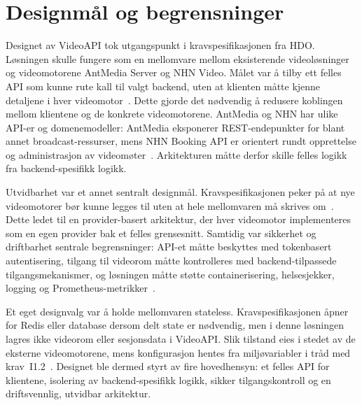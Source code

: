 \section{Designmål og begrensninger}
\label{sec:designmal}

Designet av VideoAPI tok utgangspunkt i kravspesifikasjonen fra HDO. Løsningen
skulle fungere som en mellomvare mellom eksisterende videoløsninger og
videomotorene AntMedia Server og NHN Video. Målet var å tilby ett felles API som
kunne rute kall til valgt backend, uten at klienten måtte kjenne detaljene i hver
videomotor~\cite{hdo_kravspec}. Dette gjorde det nødvendig å redusere koblingen
mellom klientene og de konkrete videomotorene. AntMedia og NHN har ulike API-er
og domenemodeller: AntMedia eksponerer REST-endepunkter for blant annet
broadcast-ressurser, mens NHN Booking API er orientert rundt opprettelse og
administrasjon av videomøter~\cite{antmedia_rest,nhn_booking}. Arkitekturen måtte
derfor skille felles logikk fra backend-spesifikk logikk.

Utvidbarhet var et annet sentralt designmål. Kravspesifikasjonen peker på at nye
videomotorer bør kunne legges til uten at hele mellomvaren må skrives
om~\cite{hdo_kravspec}. Dette ledet til en provider-basert arkitektur, der hver
videomotor implementeres som en egen provider bak et felles grensesnitt. Samtidig
var sikkerhet og driftbarhet sentrale begrensninger: API-et måtte beskyttes med
tokenbasert autentisering, tilgang til videorom måtte kontrolleres med
backend-tilpassede tilgangsmekanismer, og løsningen måtte støtte
containerisering, helsesjekker, logging og Prometheus-metrikker~\cite{hdo_kravspec}.

Et eget designvalg var å holde mellomvaren stateless. Kravspesifikasjonen åpner
for Redis eller database dersom delt state er nødvendig, men i denne løsningen
lagres ikke videorom eller sesjonsdata i VideoAPI. Slik tilstand eies i stedet
av de eksterne videomotorene, mens konfigurasjon hentes fra miljøvariabler i
tråd med krav~I1.2~\cite{hdo_kravspec}. Designet ble dermed styrt av fire
hovedhensyn: et felles API for klientene, isolering av backend-spesifikk logikk,
sikker tilgangskontroll og en driftsvennlig, utvidbar arkitektur.